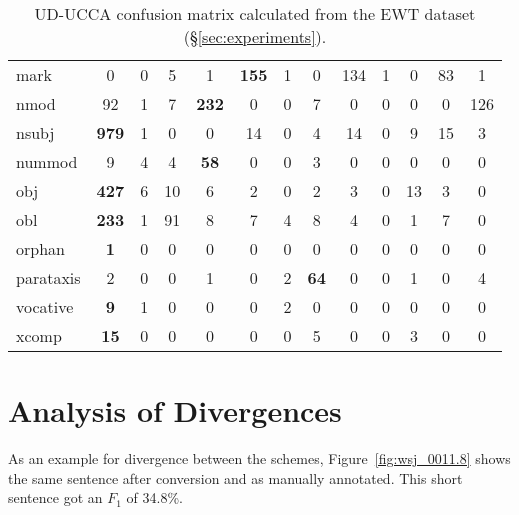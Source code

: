 \documentclass[11pt,a4paper]{article}
\begin{document}
\begin{table}[t]
\begin{tabular}{l|cccccccccccc}
mark & 0 & 0 & 5 & 1 & \textbf{155} & 1 & 0 & 134 & 1 & 0 & 83 & 1 \\
nmod & 92 & 1 & 7 & \textbf{232} & 0 & 0 & 7 & 0 & 0 & 0 & 0 & 126 \\
nsubj & \textbf{979} & 1 & 0 & 0 & 14 & 0 & 4 & 14 & 0 & 9 & 15 & 3 \\
nummod & 9 & 4 & 4 & \textbf{58} & 0 & 0 & 3 & 0 & 0 & 0 & 0 & 0 \\
obj & \textbf{427} & 6 & 10 & 6 & 2 & 0 & 2 & 3 & 0 & 13 & 3 & 0 \\
obl & \textbf{233} & 1 & 91 & 8 & 7 & 4 & 8 & 4 & 0 & 1 & 7 & 0 \\
orphan & \textbf{1} & 0 & 0 & 0 & 0 & 0 & 0 & 0 & 0 & 0 & 0 & 0 \\
parataxis & 2 & 0 & 0 & 1 & 0 & 2 & \textbf{64} & 0 & 0 & 1 & 0 & 4 \\
vocative & \textbf{9} & 1 & 0 & 0 & 0 & 2 & 0 & 0 & 0 & 0 & 0 & 0 \\
xcomp & \textbf{15} & 0 & 0 & 0 & 0 & 0 & 5 & 0 & 0 & 3 & 0 & 0
\end{tabular}
\caption{UD-UCCA confusion matrix calculated from the EWT dataset (\S\ref{sec:experiments}).
\label{tab:confusion_matrix}}
\end{table}



\section{Analysis of Divergences}\label{sec:analysis}



As an example for divergence between the schemes, Figure~\ref{fig:wsj_0011.8} shows
the same sentence after conversion and as manually annotated.
This short sentence got an $F_1$ of 34.8\%.
\end{document}
